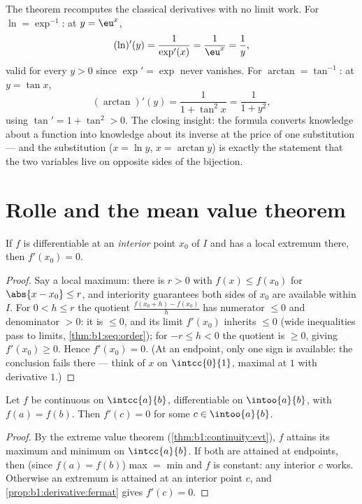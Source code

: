 \begin{example}\label{ex:b1:derivative:inverseaction}
The theorem recomputes the classical derivatives with no limit
work. For $\ln = \exp^{-1}$: at $y = \eu^x$,
\[
(\ln)'(y) = \frac{1}{\exp'(x)} = \frac{1}{\eu^{x}} = \frac1y ,
\]
valid for every $y > 0$ since $\exp' = \exp$ never vanishes. For
$\arctan = \tan^{-1}$: at $y = \tan x$,
\[
(\arctan)'(y) = \frac{1}{1 + \tan^2 x} = \frac{1}{1 + y^2} ,
\]
using $\tan' = 1 + \tan^2 > 0$. The closing insight: the formula
converts knowledge about a function into knowledge about its
inverse at the price of one substitution --- and the
substitution ($x = \ln y$, $x = \arctan y$) is exactly the
statement that the two variables live on opposite sides of the
bijection.
\end{example}

\section{Rolle and the mean value theorem}

\begin{proposition}\label{prop:b1:derivative:fermat}
If $f$ is differentiable at an \emph{interior} point $x_0$ of $I$ and
has a local extremum there, then $f'(x_0) = 0$.
\end{proposition}

\begin{proof}
Say a local maximum: there is $r > 0$ with $f(x) \leq f(x_0)$
for $\abs{x - x_0} \leq r$, and interiority guarantees both
sides of $x_0$ are available within $I$. For $0 < h \leq r$ the
quotient $\frac{f(x_0 + h) - f(x_0)}{h}$ has numerator $\leq 0$
and denominator $> 0$: it is $\leq 0$, and its limit $f'(x_0)$
inherits $\leq 0$ (wide inequalities pass to limits,
\cref{thm:b1:seq:order}); for $-r \leq h < 0$ the quotient is
$\geq 0$, giving $f'(x_0) \geq 0$. Hence $f'(x_0) = 0$. (At an
endpoint, only one sign is available: the conclusion fails there ---
think of $x$ on $\intcc{0}{1}$, maximal at $1$ with derivative
$1$.)
\end{proof}

\begin{theorem}[Rolle]\label{thm:b1:derivative:rolle}
Let $f$ be continuous on $\intcc{a}{b}$, differentiable on
$\intoo{a}{b}$, with $f(a) = f(b)$. Then $f'(c) = 0$ for some $c \in
\intoo{a}{b}$.
\end{theorem}

\begin{proof}
By the extreme value theorem (\cref{thm:b1:continuity:evt}), $f$
attains its maximum and minimum on $\intcc{a}{b}$. If both are
attained at endpoints, then (since $f(a) = f(b)$) max $=$ min and $f$
is constant: any interior $c$ works. Otherwise an extremum is
attained at an interior point $c$, and
\cref{prop:b1:derivative:fermat} gives $f'(c) = 0$.
\end{proof}

